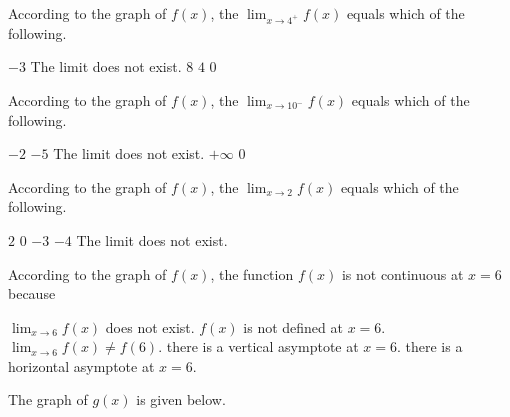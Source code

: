 \documentclass[11pt]{article}
\begin{document}
\begin{questions}
\begin{multiplechoice}{5}

\question According to the graph of $f(x)$, the $\lim_{x\to 4^+}f(x) $ equals which of the following.
\begin{answers}{3}
\ans $-3$
\ans The limit does not exist.
\ans $8$
\ans $4$
\ans $0$
\end{answers}



\question According to the graph of $f(x)$, the $\lim_{x\to 10^-}f(x) $ equals which of the following.
\begin{answers}{3}
\ans $-2$
\ans $-5$
\ans The limit does not exist.
\ans $+\infty$
\ans $0$
\end{answers}


\question According to the graph of $f(x)$, the $\lim_{x\to 2}f(x) $ equals which of the following.
\begin{answers}{3}
\ans $2$
\ans $0$
\ans $-3$
\ans $-4$
\ans The limit does not exist.
\end{answers}





\question According to the graph of $f(x)$, the function $f(x)$ is not continuous at $x=6$ because
\begin{answers}{3}
\ans $\lim_{x\to 6}f(x)$ does not exist.
\ans $f(x)$ is not defined at $x=6$.
\ans $\lim_{x\to 6}f(x) \neq f(6)$.
\ans there is a vertical asymptote at $x=6$.
\ans there is a horizontal asymptote at $x=6$. 
\end{answers}



\nextpage

\question The graph of $g(x)$ is given below.\\


\end{multiplechoice}
\end{questions}
\end{document}
